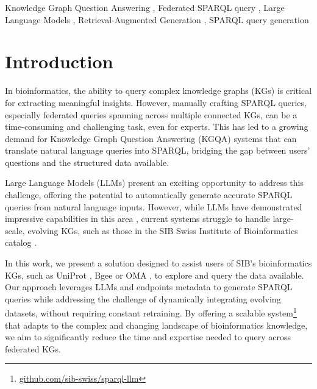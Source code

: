 \documentclass[
]{ceurart}
\begin{document}
\begin{keywords}
  Knowledge Graph Question Answering \sep
  Federated SPARQL query \sep 
  Large Language Models \sep 
  Retrieval-Augmented Generation \sep
  SPARQL query generation
\end{keywords}

\maketitle

\section{Introduction}

In bioinformatics, the ability to query complex knowledge graphs (KGs) is critical for extracting meaningful insights. However, manually crafting SPARQL queries, especially federated queries spanning across multiple connected KGs, can be a time-consuming and challenging task, even for experts. This has led to a growing demand for Knowledge Graph Question Answering (KGQA) systems that can translate natural language queries into SPARQL, bridging the gap between users' questions and the structured data available. 

Large Language Models (LLMs) present an exciting opportunity to address this challenge, offering the potential to automatically generate accurate SPARQL queries from natural language inputs. However, while LLMs have demonstrated impressive capabilities in this area \cite{sima2023potential}\cite{meyer2024assessingsparqlcapabilitieslarge}, current systems struggle to handle large-scale, evolving KGs, such as those in the SIB Swiss Institute of Bioinformatics catalog \cite{sib2024sib}.

In this work, we present a solution designed to assist users of SIB’s bioinformatics KGs\cite{sima2019enabling}, such as UniProt \cite{uniprot2023uniprot}, Bgee \cite{bastian2021bgee} or OMA \cite{altenhoff2024oma}, to explore and query the data available. Our approach leverages LLMs and endpoints metadata to generate SPARQL queries while addressing the challenge of dynamically integrating evolving datasets, without requiring constant retraining. By offering a scalable system\footnote{\href{https://github.com/sib-swiss/sparql-llm}{github.com/sib-swiss/sparql-llm}} that adapts to the complex and changing landscape of bioinformatics knowledge, we aim to significantly reduce the time and expertise needed to query across federated KGs.
\end{document}
